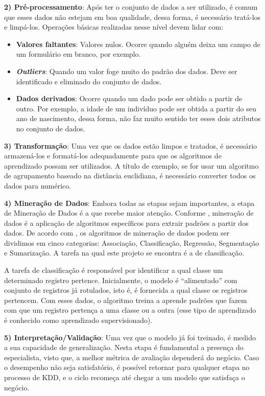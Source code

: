\textbf{2) Pré-processamento}: Após ter o conjunto de dados a ser utilizado, é comum que esses dados não estejam em boa qualidade, dessa forma, é necessário tratá-los e limpá-los. Operações básicas realizadas nesse nível devem lidar com:

\begin{itemize}
    \item \textbf{Valores faltantes}: Valores nulos. Ocorre quando alguém deixa um campo de um formulário em branco, por exemplo.
    \item \textbf{\textit{Outliers}}: Quando um valor foge muito do padrão dos dados. Deve ser identificado e eliminado do conjunto de dados.
    \item \textbf{Dados derivados}: Ocorre quando um dado pode ser obtido a partir de outro. Por exemplo, a idade de um indivíduo pode ser obtida a partir do seu ano de nascimento, dessa forma, não faz muito sentido ter esses dois atributos no conjunto de dados.
\end{itemize}

\textbf{3) Transformação}: Uma vez que os dados estão limpos e tratados, é necessário armazená-los e formatá-los adequadamente para que os algoritmos de aprendizado possam ser utilizados. A título de exemplo, se for usar um algoritmo de agrupamento baseado na distância euclidiana, é necessário converter todos os dados para numérico.

\textbf{4) Mineração de Dados}:  Embora todas as etapas sejam importantes, a etapa de Mineração de Dados é a que recebe maior atenção. Conforme \cite{fayyad:1996}, mineração de dados é a aplicação de algoritmos específicos para extrair padrões a partir dos dados. De acordo com \citeauthor{fayyad:1996}, os algoritmos de mineração de dados podem ser dividimos em cinco categorias: Associação, Classificação, Regressão, Segmentação e Sumarização. A tarefa na qual este projeto se encontra é a de classificação. 

A tarefa de classificação é responsável por identificar a qual classe um determinado registro pertence. Inicialmente, o modelo é ``alimentado'' com conjunto de registros já rotulados, isto é, é fornecida a qual classe os registros pertencem. Com esses dados, o algoritmo treina a aprende padrões que fazem com que um registro pertença a uma classe ou a outra
(esse tipo de aprendizado é conhecido como aprendizado supervisionado).


\textbf{5) Interpretação/Validação}: Uma vez que o modelo já foi treinado, é medido a sua capacidade de generalização. Nesta etapa é fundamental a presença do especialista, visto que, a melhor métrica de avaliação dependerá do negócio. Caso o desempenho não seja satisfatório, é possível retornar para qualquer etapa no processo de KDD, e o ciclo recomeça até chegar a um modelo que satisfaça o negócio.





